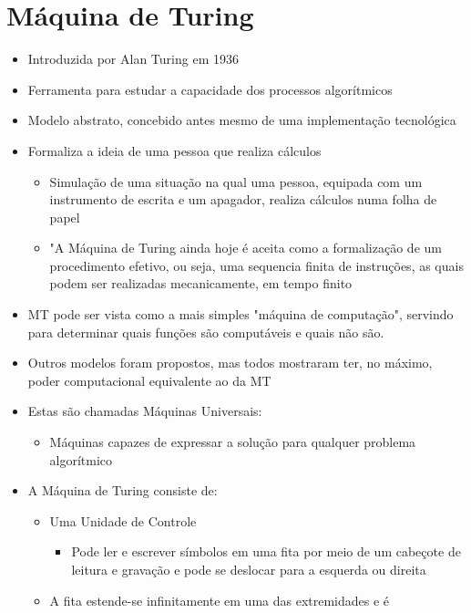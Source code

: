 \documentclass[12pt]{article}
\begin{document}
\section{Máquina de Turing}
\begin{itemize}
    \item Introduzida por Alan Turing em 1936
    \item Ferramenta para estudar a capacidade dos processos algorítmicos
    \item Modelo abstrato, concebido antes mesmo de uma implementação tecnológica
    \item Formaliza a ideia de uma pessoa que realiza cálculos
    \begin{itemize}
        \item Simulação de uma situação na qual uma pessoa, equipada com um 
        instrumento de escrita e um apagador, realiza cálculos numa folha de 
        papel
        \item "A Máquina de Turing ainda hoje é aceita como a formalização de 
        um procedimento efetivo, ou seja, uma sequencia finita de instruções, 
        as quais podem ser realizadas mecanicamente, em tempo finito
    \end{itemize}
    \item MT pode ser vista como a mais simples "máquina de computação", servindo
    para determinar quais funções são computáveis e quais não são.
    \item Outros modelos foram propostos, mas todos mostraram ter, no máximo, 
    poder computacional equivalente ao da MT 
    \item Estas são chamadas Máquinas Universais:
    \begin{itemize}
        \item Máquinas capazes de expressar a solução para qualquer problema 
        algorítmico
    \end{itemize}
    \item A Máquina de Turing consiste de:
    \begin{itemize}
        \item Uma Unidade de Controle
        \begin{itemize}
            \item Pode ler e escrever símbolos em uma fita por meio de um 
            cabeçote de leitura e gravação e pode se deslocar para a esquerda 
            ou direita
        \end{itemize}
        \item A fita estende-se infinitamente em uma das extremidades e é 

\end{itemize}
\end{itemize}
\end{document}
